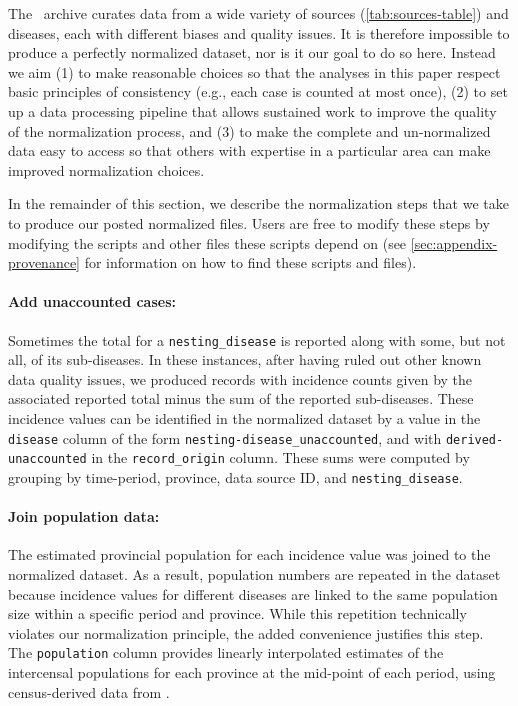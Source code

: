 \documentclass[12pt]{article}
\begin{document}
The \datacronym\ archive curates data from a wide variety of sources (\cref{tab:sources-table}) and diseases, each with different biases and quality issues. It is therefore impossible to produce a perfectly normalized dataset, nor is it our goal to do so here. Instead we aim (1) to make reasonable choices so that the analyses in this paper respect basic principles of consistency (e.g., each case is counted at most once), (2) to set up a data processing pipeline that allows sustained work to improve the quality of the normalization process, and (3) to make the complete and un-normalized data easy to access so that others with expertise in a particular area can make improved normalization choices. 

In the remainder of this section, we describe the normalization steps that we take to produce our posted normalized files. Users are free to modify these steps by modifying the scripts and other files these scripts depend on (see \cref{sec:appendix-provenance} for information on how to find these scripts and files).

\paragraph{Add unaccounted cases:} Sometimes the total for a \texttt{nesting\_disease} is reported along with some, but not all, of its sub-diseases. In these instances, after having ruled out other known data quality issues, we produced records with incidence counts given by the associated reported total minus the sum of the reported sub-diseases. These incidence values can be identified in the normalized dataset by a value in the \texttt{disease} column of the form \texttt{nesting-disease\_unaccounted}, and with \texttt{derived-unaccounted} in the \texttt{record\_origin} column. These sums were computed by grouping by time-period, province, data source ID, and \texttt{nesting\_disease}.

\paragraph{Join population data:} The estimated provincial population for each incidence value was joined to the normalized dataset. As a result, population numbers are repeated in the dataset because incidence values for different diseases are linked to the same population size within a specific period and province. While this repetition technically violates our normalization principle, the added convenience justifies this step. The \texttt{population} column provides linearly interpolated estimates of the intercensal populations for each province at the mid-point of each period, using census-derived data from \cite{canada1925sixth,statistics1973population,statcan2021population}.
\end{document}
